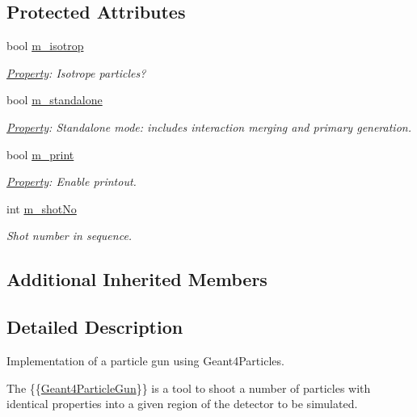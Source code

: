 \subsection*{Protected Attributes}
\begin{DoxyCompactItemize}
\item 
bool \hyperlink{class_d_d4hep_1_1_simulation_1_1_geant4_particle_gun_aba05dc63eaf9a7f7d06932d9f66eb154}{m\+\_\+isotrop}
\begin{DoxyCompactList}\small\item\em \hyperlink{class_d_d4hep_1_1_property}{Property}\+: Isotrope particles? \end{DoxyCompactList}\item 
bool \hyperlink{class_d_d4hep_1_1_simulation_1_1_geant4_particle_gun_af845ef9f13542031af0bf41b53a9f462}{m\+\_\+standalone}
\begin{DoxyCompactList}\small\item\em \hyperlink{class_d_d4hep_1_1_property}{Property}\+: Standalone mode\+: includes interaction merging and primary generation. \end{DoxyCompactList}\item 
bool \hyperlink{class_d_d4hep_1_1_simulation_1_1_geant4_particle_gun_ac7ffd1d0ae00fc56978aef5cf7ec6b83}{m\+\_\+print}
\begin{DoxyCompactList}\small\item\em \hyperlink{class_d_d4hep_1_1_property}{Property}\+: Enable printout. \end{DoxyCompactList}\item 
int \hyperlink{class_d_d4hep_1_1_simulation_1_1_geant4_particle_gun_a385166af11357b6ec06b835b4ee8cca6}{m\+\_\+shot\+No}
\begin{DoxyCompactList}\small\item\em Shot number in sequence. \end{DoxyCompactList}\end{DoxyCompactItemize}
\subsection*{Additional Inherited Members}


\subsection{Detailed Description}
Implementation of a particle gun using Geant4\+Particles. 

The \{\{\hyperlink{class_d_d4hep_1_1_simulation_1_1_geant4_particle_gun}{Geant4\+Particle\+Gun}\}\} is a tool to shoot a number of particles with identical properties into a given region of the detector to be simulated.

